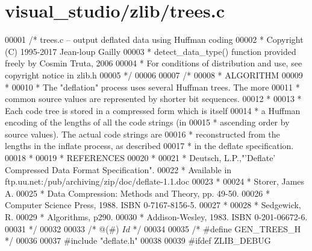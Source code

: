 \hypertarget{visual__studio_2zlib_2trees_8c_source}{}\section{visual\+\_\+studio/zlib/trees.c}
\label{visual__studio_2zlib_2trees_8c_source}

\begin{DoxyCode}
00001 \textcolor{comment}{/* trees.c -- output deflated data using Huffman coding}
00002 \textcolor{comment}{ * Copyright (C) 1995-2017 Jean-loup Gailly}
00003 \textcolor{comment}{ * detect\_data\_type() function provided freely by Cosmin Truta, 2006}
00004 \textcolor{comment}{ * For conditions of distribution and use, see copyright notice in zlib.h}
00005 \textcolor{comment}{ */}
00006 
00007 \textcolor{comment}{/*}
00008 \textcolor{comment}{ *  ALGORITHM}
00009 \textcolor{comment}{ *}
00010 \textcolor{comment}{ *      The "deflation" process uses several Huffman trees. The more}
00011 \textcolor{comment}{ *      common source values are represented by shorter bit sequences.}
00012 \textcolor{comment}{ *}
00013 \textcolor{comment}{ *      Each code tree is stored in a compressed form which is itself}
00014 \textcolor{comment}{ * a Huffman encoding of the lengths of all the code strings (in}
00015 \textcolor{comment}{ * ascending order by source values).  The actual code strings are}
00016 \textcolor{comment}{ * reconstructed from the lengths in the inflate process, as described}
00017 \textcolor{comment}{ * in the deflate specification.}
00018 \textcolor{comment}{ *}
00019 \textcolor{comment}{ *  REFERENCES}
00020 \textcolor{comment}{ *}
00021 \textcolor{comment}{ *      Deutsch, L.P.,"'Deflate' Compressed Data Format Specification".}
00022 \textcolor{comment}{ *      Available in ftp.uu.net:/pub/archiving/zip/doc/deflate-1.1.doc}
00023 \textcolor{comment}{ *}
00024 \textcolor{comment}{ *      Storer, James A.}
00025 \textcolor{comment}{ *          Data Compression:  Methods and Theory, pp. 49-50.}
00026 \textcolor{comment}{ *          Computer Science Press, 1988.  ISBN 0-7167-8156-5.}
00027 \textcolor{comment}{ *}
00028 \textcolor{comment}{ *      Sedgewick, R.}
00029 \textcolor{comment}{ *          Algorithms, p290.}
00030 \textcolor{comment}{ *          Addison-Wesley, 1983. ISBN 0-201-06672-6.}
00031 \textcolor{comment}{ */}
00032 
00033 \textcolor{comment}{/* @(#) $Id$ */}
00034 
00035 \textcolor{comment}{/* #define GEN\_TREES\_H */}
00036 
00037 \textcolor{preprocessor}{#include "deflate.h"}
00038 
00039 \textcolor{preprocessor}{#ifdef ZLIB\_DEBUG}

\end{DoxyCode}
